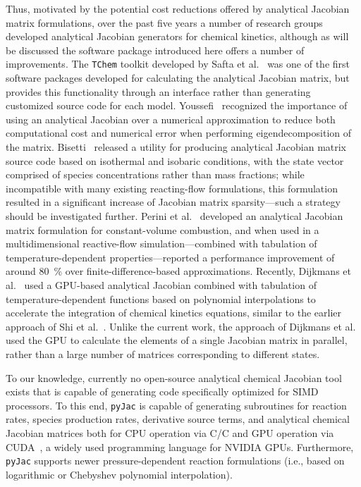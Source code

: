 \documentclass[preprint,12pt]{elsarticle}
\def\CC{{C\nolinebreak[4]\hspace{-.05em}\raisebox{.4ex}{\footnotesize ++}}}
\begin{document}
Thus, motivated by the potential cost reductions offered by analytical Jacobian matrix formulations, over the past five years a number of research groups developed analytical Jacobian generators for chemical kinetics, although as will be discussed the software package introduced here offers a number of improvements.
The \texttt{TChem} toolkit developed by Safta et al.~\cite{Safta:2011vn} was one of the first software packages developed for calculating the analytical Jacobian matrix, but provides this functionality through an interface rather than generating customized source code for each model.
Youssefi~\cite{Youssefi:2011tm} recognized the importance of using an analytical Jacobian over a numerical approximation to reduce both computational cost and numerical error when performing eigendecomposition of the matrix.
Bisetti~\cite{Bisetti:2012jw} released a utility for producing analytical Jacobian matrix source code based on isothermal and isobaric conditions, with the state vector comprised of species concentrations rather than mass fractions; while incompatible with many existing reacting-flow formulations, this formulation resulted in a significant increase of Jacobian matrix sparsity---such a strategy should be investigated further.
Perini et al.~\cite{Perini:2012gy} developed an analytical Jacobian matrix formulation for constant-volume combustion, and when used in a multidimensional reactive-flow simulation---combined with tabulation of temperature-dependent properties---reported a performance improvement of around \SI{80}{\percent} over finite-difference-based approximations.
Recently, Dijkmans et al.~\cite{Dijkmans:2014bb} used a GPU-based analytical Jacobian combined with tabulation of temperature-dependent functions based on polynomial interpolations to accelerate the integration of chemical kinetics equations, similar to the earlier approach of Shi et al.~\cite{Shi:2011aa}.
Unlike the current work, the approach of Dijkmans et al.~\cite{Dijkmans:2014bb} used the GPU to calculate the elements of a single Jacobian matrix in parallel, rather than a large number of matrices corresponding to different states.

To our knowledge, currently no open-source analytical chemical Jacobian tool exists that is capable of generating code specifically optimized for SIMD processors.
To this end, \texttt{pyJac} is capable of generating subroutines for reaction rates, species production rates, derivative source terms, and analytical chemical Jacobian matrices both for CPU operation via C\slash \CC{} and GPU operation via CUDA~\cite{Nickolls:2008aa}, a widely used programming language for NVIDIA GPUs.
Furthermore, \texttt{pyJac} supports newer pressure-dependent reaction formulations (i.e., based on logarithmic or Chebyshev polynomial interpolation).
\end{document}
